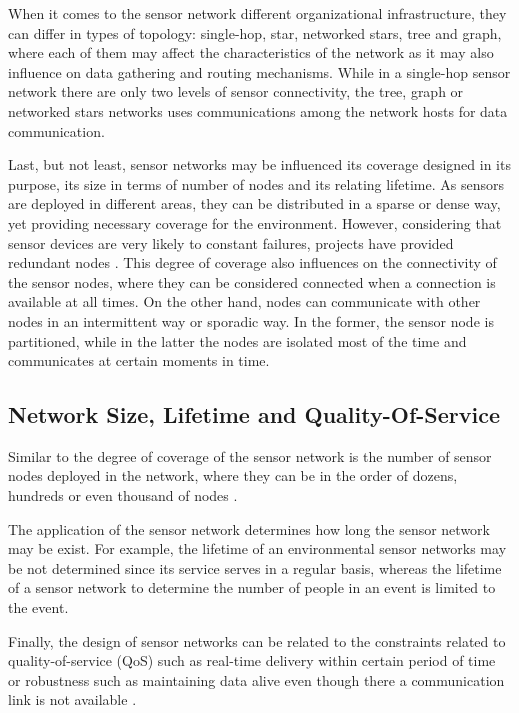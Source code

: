 When it comes to the sensor network different organizational infrastructure,
they can differ in types of topology: single-hop, star, networked stars, tree
and graph, where each of them may affect the characteristics of the network as it 
may also influence on data gathering and routing mechanisms. While in a
single-hop sensor network there are only two levels of sensor connectivity, the
tree, graph or networked stars networks uses communications among the network
hosts for data communication.

Last, but not least, sensor networks may be influenced its coverage designed in
its purpose, its size in terms of number of nodes and its relating lifetime. As
sensors are deployed in different areas, they can be distributed in a sparse or
dense way, yet providing necessary coverage for the environment. However, 
considering that sensor devices are very likely to constant failures, projects 
have provided redundant nodes \cite{snintro01}. This degree of coverage also 
influences on the connectivity of the sensor nodes, where they can be
considered connected when a connection is available at all times. On the other
hand, nodes can communicate with other nodes in an intermittent way or sporadic
way. In the former, the sensor node is partitioned, while in the latter the
nodes are isolated most of the time and communicates at certain moments in
time.

\subsection{Network Size, Lifetime and Quality-Of-Service}

Similar to the degree of coverage of the sensor network is the number of
sensor nodes deployed in the network, where they can be in the order of
dozens, hundreds or even thousand of nodes \cite{snintro01}.

The application of the sensor network determines how long the sensor
network may be exist. For example, the lifetime of an environmental sensor
networks \cite{snex01} may be not determined since its service serves in a
regular basis, whereas the lifetime of a sensor network to determine the number
of people in an event is limited to the event. 

Finally, the design of sensor networks can be related to the constraints
related to quality-of-service (QoS) such as real-time delivery within certain
period of time or robustness such as maintaining data alive even though there
a communication link is not available \cite{snintro02}.

